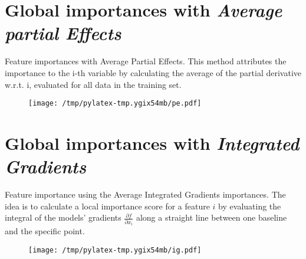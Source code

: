 \documentclass{article}%
\begin{document}
\section*{Global importances with \textit{Average partial Effects}}%
\label{sec:GlobalimportanceswithtextitAveragepartialEffects}%

                Feature importances with Average Partial Effects. This method
                attributes the importance to the i-th variable by calculating
                the average of the partial derivative w.r.t. i, evaluated for
                all data in the training set.

                \vfill%


\begin{figure}[H]%
\centering%
\texttt{[image: /tmp/pylatex-tmp.ygix54mb/pe.pdf]}%
\end{figure}

%
\vfill \pagebreak

%

                \chead{}
                \rhead{\today, \currenttime}
                
                \lfoot{}
                \cfoot{}
                \rfoot{\thepage\ | \pageref{LastPage}}
\section*{Global importances with \textit{Integrated Gradients}}%
\label{sec:GlobalimportanceswithtextitIntegratedGradients}%

                Feature importance using the Average Integrated Gradients
                importances. The idea is to calculate a local
                importance score for a feature $i$ by evaluating the integral of
                the models' gradients $\frac{\partial f}{\partial x_i}$ along a
                straight line between one baseline and the specific point.
            
                \vfill%


\begin{figure}[H]%
\centering%
\texttt{[image: /tmp/pylatex-tmp.ygix54mb/ig.pdf]}%
\end{figure}

%
\vfill \pagebreak

%

                \chead{}
                \rhead{\today, \currenttime}
                
\end{document}
